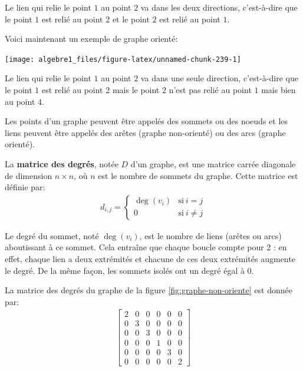 \documentclass[]{book}
\theoremstyle{definition}
\theoremstyle{definition}
\theoremstyle{definition}
\theoremstyle{remark}
\let\BeginKnitrBlock\begin \let\EndKnitrBlock\end
\begin{document}
Le lien qui relie le point \(1\) au point \(2\) va dans les deux directions, c'est-à-dire que le point \(1\) est relié au point \(2\) et le point \(2\) est relié au point \(1\).

Voici maintenant un exemple de graphe orienté:

\begin{center}\texttt{[image: algebre1\_files/figure-latex/unnamed-chunk-239-1]} \end{center}

Le lien qui relie le point \(1\) au point \(2\) va dans une seule direction, c'est-à-dire que le point \(1\) est relié au point \(2\) mais le point \(2\) n'est pas relié au point \(1\) mais bien au point \(4\).

Les points d'un graphe peuvent être appelés des sommets ou des noeuds et les liens peuvent être appelés des arêtes (graphe non-orienté) ou des arcs (graphe orienté).

\BeginKnitrBlock{definition}[La matrice des degrés]
\protect\hypertarget{def:unnamed-chunk-240}{}{\label{def:unnamed-chunk-240} {} }La \textbf{matrice des degrés}, notée \(D\) d'un graphe, est une matrice carrée diagonale de dimension \(n \times n\), où \(n\) est le nombre de sommets du graphe. Cette matrice est définie par:
\begin{align*}
d_{i,j}=\left\{
\begin{matrix} 
\deg(v_i) & \mbox{si}\ i = j \\
0 & \mbox{si}\ i \neq j
\end{matrix}
\right.
\end{align*}

Le degré du sommet, noté \(\deg(v_i)\), est le nombre de liens (arêtes ou arcs) aboutissant à ce sommet. Cela entraîne que chaque boucle compte pour 2 : en effet, chaque lien a deux extrémités et chacune de ces deux extrémités augmente le degré. De la même façon, les sommets isolés ont un degré égal à 0.
\EndKnitrBlock{definition}

La matrice des degrés du graphe de la figure \ref{fig:graphe-non-oriente} est donnée par:
\begin{align*}
\begin{bmatrix}
2 & 0 & 0 & 0 & 0 & 0 \\
0 & 3 & 0 & 0 & 0 & 0 \\
0 & 0 & 3 & 0 & 0 & 0 \\
0 & 0 & 0 & 1 & 0 & 0 \\
0 & 0 & 0 & 0 & 3 & 0 \\
0 & 0 & 0 & 0 & 0 & 2
\end{bmatrix}
\end{align*}
\end{document}
